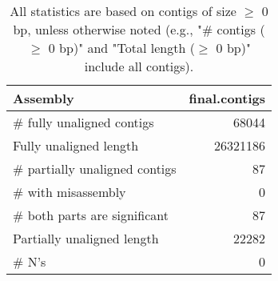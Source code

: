 \documentclass[12pt,a4paper]{article}
\begin{document}
\begin{table}[ht]
\begin{center}
\caption{All statistics are based on contigs of size $\geq$ 0 bp, unless otherwise noted (e.g., "\# contigs ($\geq$ 0 bp)" and "Total length ($\geq$ 0 bp)" include all contigs).}
\begin{tabular}{|l*{1}{|r}|}
\hline
Assembly & final.contigs \\ \hline
\# fully unaligned contigs & 68044 \\ \hline
Fully unaligned length & 26321186 \\ \hline
\# partially unaligned contigs & 87 \\ \hline
\hspace{5mm}\# with misassembly & 0 \\ \hline
\hspace{5mm}\# both parts are significant & 87 \\ \hline
Partially unaligned length & 22282 \\ \hline
\# N's & 0 \\ \hline
\end{tabular}
\end{center}
\end{table}
\end{document}
